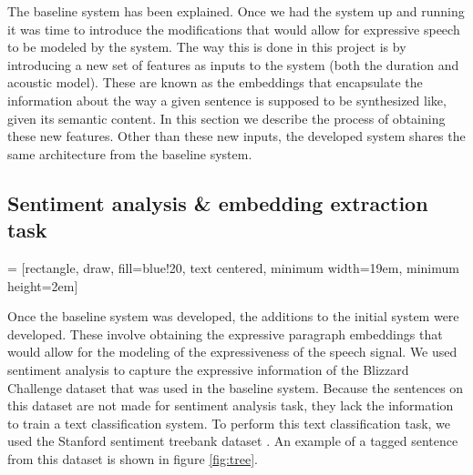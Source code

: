 The baseline system has been explained. Once we had the system up and running it was time to introduce the modifications that would allow for expressive speech to be modeled by the system. The way this is done in this project is by introducing a new set of features as inputs to the system (both the duration and acoustic model). These are known as the embeddings that encapsulate the information about the way a given sentence is supposed to be synthesized like, given its semantic content. In this section we describe the process of obtaining these new features. Other than these new inputs, the developed system shares the same architecture from the baseline system.

\subsection{Sentiment analysis \& embedding extraction task} \label{sec:sa}

 = [rectangle, draw, fill=blue!20, text centered, minimum width=19em, minimum height=2em]

Once the baseline system was developed, the additions to the initial system were developed. These involve obtaining the expressive paragraph embeddings that would allow for the modeling of the expressiveness of the speech signal. We used sentiment analysis to capture the expressive information of the Blizzard Challenge dataset that was used in the baseline system. Because the sentences on this dataset are not made for sentiment analysis task, they lack the information to train a text classification system. To perform this text classification task, we used the Stanford sentiment treebank dataset \cite{socher2013recursive}. An example of a tagged sentence from this dataset is shown in figure \ref{fig:tree}.


